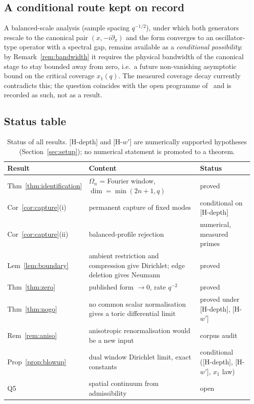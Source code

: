 \documentclass[11pt,a4paper]{article}
\theoremstyle{plain}
\theoremstyle{definition}
\theoremstyle{remark}
\begin{document}
  \subsection{A conditional route kept on record}

    A balanced-scale analysis (sample spacing $q^{-1/2}$), under which both generators rescale to the
    canonical pair $(x, -i\partial_x)$ and the form converges to an oscillator-type operator with a
    spectral gap, remains available as a \emph{conditional possibility}: by
    Remark~\ref{rem:bandwidth} it requires the physical bandwidth of the canonical stage to stay
    bounded away from zero, i.e.\ a future non-vanishing asymptotic bound on the critical coverage
    $x_1(q)$.
    The measured coverage decay currently contradicts this; the question coincides with the open
    programme of~\cite{Beau2026ccnote} and is recorded as such, not as a result.

  \subsection{Status table}

  \begin{table}[ht]
    \centering
    \small
    \renewcommand{\arraystretch}{1.3}
    \begin{tabularx}{\textwidth}{@{}lXp{3.6cm}@{}}
        \toprule
        Result & Content & Status \\
        \midrule
        Thm~\ref{thm:identification} & $\Omega_n$ = Fourier window, $\dim = \min(2n{+}1, q)$
        & proved \\
        Cor~\ref{cor:capture}(i) & permanent capture of fixed modes & conditional on [H-depth] \\
        Cor~\ref{cor:capture}(ii) & balanced-profile rejection & numerical, measured primes \\
        Lem~\ref{lem:boundary} & ambient restriction and compression give Dirichlet; edge deletion
        gives Neumann & proved \\
        Thm~\ref{thm:zero} & published form $\to 0$, rate $q^{-2}$ & proved \\
        Thm~\ref{thm:nogo} & no common scalar normalisation gives a toric differential limit
        & proved under [H-depth], [H-$w'$] \\
        Rem~\ref{rem:aniso} & anisotropic renormalisation would be a new input & corpus audit \\
        Prop~\ref{prop:blowup} & dual window Dirichlet limit, exact constants
        & conditional ([H-depth], [H-$w'$], $x_1$ law) \\
        Q5 & spatial continuum from admissibility & open \\
        \bottomrule
    \end{tabularx}
    \caption{Status of all results.
    [H-depth] and [H-$w'$] are numerically supported hypotheses (Section~\ref{sec:setup}); no
    numerical statement is promoted to a theorem.}
    \label{tab:status}
  \end{table}
\end{document}
